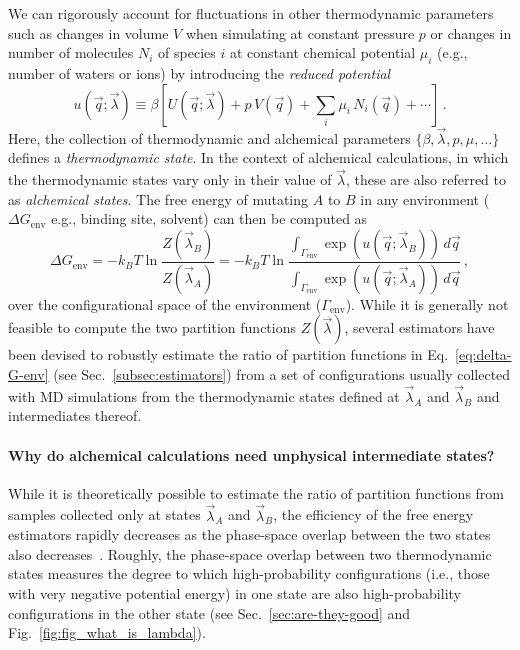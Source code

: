 \documentclass[9pt,bestpractices]{livecoms}
\begin{document}
We can rigorously account for fluctuations in other thermodynamic parameters such as changes in volume $V$ when simulating at constant pressure $p$ or changes in number of molecules $N_i$ of species $i$ at constant chemical potential $\mu_i$ (e.g., number of waters or ions) by introducing the \textit{reduced potential}~\cite{shirts2008statisticallya}
\begin{equation}\label{eq:reduced-potential}
u(\vec{q};\vec{\lambda}) \equiv \beta \left[ U(\vec{q};\vec{\lambda}) + p \, V(\vec{q}) + \sum_i \mu_i \, N_i(\vec{q}) + \cdots \right] \, .
\end{equation}
Here, the collection of thermodynamic and alchemical parameters $\{\beta, \vec{\lambda}, p, \mu, \ldots\}$ defines a \emph{thermodynamic state}.
In the context of alchemical calculations, in which the thermodynamic states vary only in their value of $\vec{\lambda}$, these are also referred to as \emph{alchemical states}.
The free energy of mutating $A$ to $B$ in any environment ($\Delta G_{\mathrm{env}}$ e.g., binding site, solvent) can then be computed as
\begin{equation}\label{eq:delta-G-env}
    \Delta G_{\mathrm{env}} = - k_BT \ln \frac{Z(\vec{\lambda}_B)}{Z(\vec{\lambda}_A)} = - k_BT \ln \frac{\int_{\Gamma_{\mathrm{env}}} \exp\left( u(\vec{q}; \vec{\lambda}_B) \right) \, d\vec{q}}{\int_{\Gamma_{\mathrm{env}}} \exp\left( u(\vec{q}; \vec{\lambda}_A) \right) \, d\vec{q}} \, ,
\end{equation}
over the configurational space of the environment ($\Gamma_{\mathrm{env}}$).
While it is generally not feasible to compute the two partition functions $Z(\vec{\lambda})$, several estimators have been devised to robustly estimate the ratio of partition functions in Eq.~\ref{eq:delta-G-env} (see Sec.~\ref{subsec:estimators}) from a set of configurations usually collected with MD simulations from the thermodynamic states defined at $\vec{\lambda}_A$ and $\vec{\lambda}_B$ and intermediates thereof.

\paragraph{Why do alchemical calculations need unphysical intermediate states?}
While it is theoretically possible to estimate the ratio of partition functions from samples collected only at states $\vec{\lambda}_A$ and $\vec{\lambda}_B$, the efficiency of the free energy estimators rapidly decreases as the phase-space overlap between the two states also decreases~\cite{wu2005phasespace, wu2005phasespacea}.
Roughly, the phase-space overlap between two thermodynamic states measures the degree to which high-probability configurations (i.e., those with very negative potential energy) in one state are also high-probability configurations in the other state (see Sec.~\ref{sec:are-they-good} and Fig.~\ref{fig:fig_what_is_lambda}).
\end{document}
